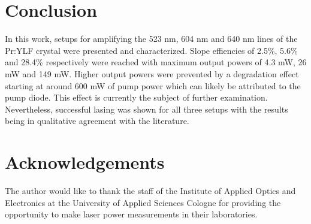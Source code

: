 \documentclass[conference]{IEEEtran}
\begin{document}
\section{Conclusion}
In this work, setups for amplifying the 523 nm, 604 nm and 640 nm lines of the Pr:YLF crystal were presented and characterized. Slope effiencies of 2.5\%, 5.6\% and 28.4\% respectively were reached with maximum output powers of 4.3 mW, 26 mW and 149 mW. Higher output powers were prevented by a degradation effect starting at around 600 mW of pump power which can likely be attributed to the pump diode. This effect is currently the subject of further examination. Nevertheless, successful lasing was shown for all three setups with the results being in qualitative agreement with the literature.
\section{Acknowledgements}
The author would like to thank the staff of the Institute of Applied Optics and Electronics at the University of Applied Sciences Cologne for providing the opportunity to make laser power measurements in their laboratories.
\printbibliography
\end{document}
